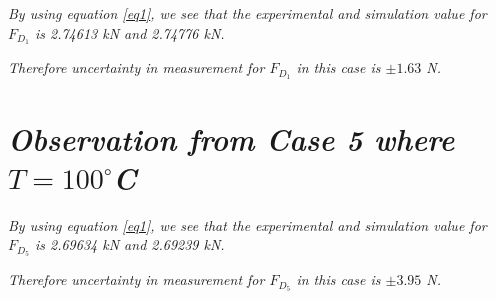 	\textit{By using equation \ref{eq1}, we see that the experimental and simulation value for $F_{D_1}$ is 2.74613 kN and 2.74776 kN.}
        
	\textit{Therefore uncertainty in measurement for $F_{D_1}$ in this case is $\pm{\textit{1.63}}$ N.}
        
        
\section{\textit{Observation from Case 5 where $T = 100^\circ$C}}
        
	\textit{By using equation \ref{eq1}, we see that the experimental and simulation value for $F_{D_5}$ is 2.69634 kN and 2.69239 kN.}
        
	\textit{Therefore uncertainty in measurement for $F_{D_5}$ in this case is $\pm{\textit{3.95}}$ N.}
        

        

        




